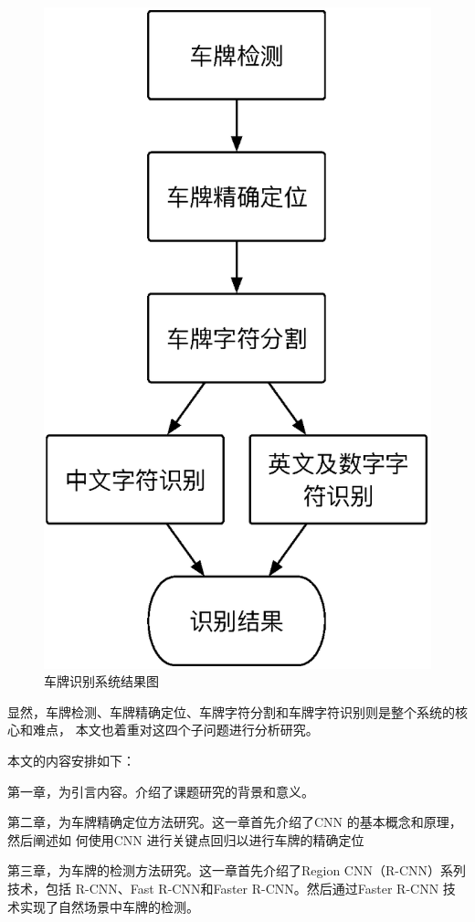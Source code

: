 \begin{figure}[ht]
  \centering
  \includegraphics[width=0.8\linewidth]{./Figure/SystemArch.eps}
  \caption{车牌识别系统结果图}\label{Fig:SystemArch}
\end{figure}

显然，车牌检测、车牌精确定位、车牌字符分割和车牌字符识别则是整个系统的核心和难点，
本文也着重对这四个子问题进行分析研究。

本文的内容安排如下：

第一章，为引言内容。介绍了课题研究的背景和意义。

第二章，为车牌精确定位方法研究。这一章首先介绍了CNN 的基本概念和原理，然后阐述如
何使用CNN 进行关键点回归以进行车牌的精确定位

第三章，为车牌的检测方法研究。这一章首先介绍了Region CNN（R-CNN）系列技术，包括
R-CNN、Fast R-CNN和Faster R-CNN。然后通过Faster R-CNN 技术实现了自然场景中车牌的检测。

